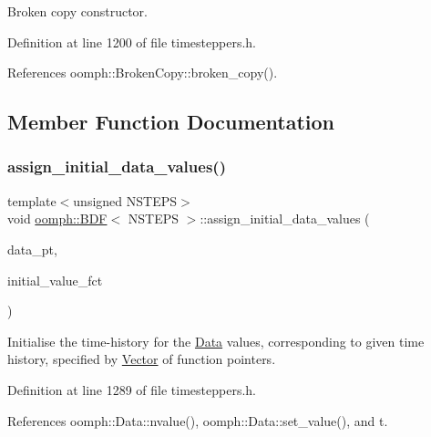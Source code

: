 Broken copy constructor. 



Definition at line 1200 of file timesteppers.\+h.



References oomph\+::\+Broken\+Copy\+::broken\+\_\+copy().



\subsection{Member Function Documentation}
\mbox{\label{classoomph_1_1BDF_ae40c166092d039798704a8969c0acc0e}} 
\subsubsection{\texorpdfstring{assign\+\_\+initial\+\_\+data\+\_\+values()}{assign\_initial\_data\_values()}}
{\footnotesize\ttfamily template$<$unsigned N\+S\+T\+E\+PS$>$ \\
void \hyperlink{classoomph_1_1BDF}{oomph\+::\+B\+DF}$<$ N\+S\+T\+E\+PS $>$\+::assign\+\_\+initial\+\_\+data\+\_\+values (\begin{DoxyParamCaption}\item[{\hyperlink{classoomph_1_1Data}{Data} $\ast$const \&}]{data\+\_\+pt,  }\item[{\hyperlink{classoomph_1_1Vector}{Vector}$<$ \hyperlink{classoomph_1_1BDF_a7b4271c53928ee107dc9b5ab218bfe74}{Initial\+Condition\+Fct\+Pt} $>$}]{initial\+\_\+value\+\_\+fct }\end{DoxyParamCaption})\hspace{0.3cm}{\ttfamily [inline]}}



Initialise the time-\/history for the \hyperlink{classoomph_1_1Data}{Data} values, corresponding to given time history, specified by \hyperlink{classoomph_1_1Vector}{Vector} of function pointers. 



Definition at line 1289 of file timesteppers.\+h.



References oomph\+::\+Data\+::nvalue(), oomph\+::\+Data\+::set\+\_\+value(), and t.

